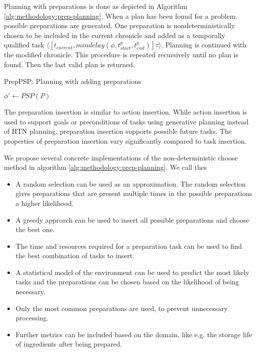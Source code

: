 Planning with preparations is done as depicted in Algorithm \ref{alg:methodology:prep-planning}.
When a plan has been found for a problem, possible preparations are generated.
One preparation is nondeterministically chosen to be included in the current chronicle and added as a temporally qualified task $\langle[t_{current}, mindelay(\phi,t^p_{start}, t^p_{end})] \tau \rangle$.
Planning is continued with the modified chronicle.
This procedure is repeated recursively until no plan is found.
Then the last valid plan is returned.

\begin{algorithm}
    \caption{PrepPSP: Planning with adding preparations}
    \label{alg:methodology:prep-planning}
    $\phi' \leftarrow PSP(P)$\;
\end{algorithm}

The preparation insertion is similar to action insertion.
While action insertion is used to support goals or preconditions of tasks using generative planning instead of HTN planning, preparation insertion supports possible future tasks.
The properties of preparation insertion vary significantly compared to task insertion.

We propose several concrete implementations of the non-deterministic choose method in algorithm \ref{alg:methodology:prep-planning}.
We call thes

\begin{itemize}
  \item A random selection can be used as an approximation.
    The random selection gives preparations that are present multiple times in the possible preparations a higher likelihood.
  \item A greedy approach can be used to insert all possible preparations and choose the best one.
  \item The time and resources required for a preparation task can be used to find the best combination of tasks to insert.
  \item A statistical model of the environment can be used to predict the most likely tasks and the preparations can be chosen based on the likelihood of being necessary.
  \item Only the most common preparations are used, to prevent unnecessary processing.
  \item Further metrics can be included based on the domain, like e.g. the storage life of ingredients after being prepared.
\end{itemize}
